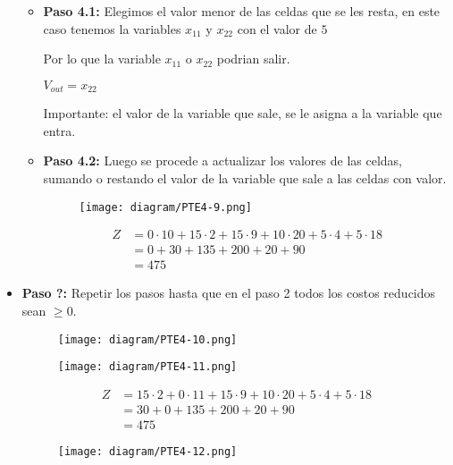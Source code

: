 \documentclass{templateNote}
\begin{document}
\begin{itemize}
    \begin{itemize}
        \item \textbf{Paso 4.1:} Elegimos el valor menor de las celdas que se les resta, en este caso tenemos la variables $x_{11}$ y $x_{22}$ con el valor de $5$
        
        Por lo que la variable $x_{11}$ o $x_{22}$ podrian salir.
        \begin{center}
            $V_{out} = x_{22}$
        \end{center}

        Importante: el valor de la variable que sale, se le asigna a la variable que entra.

        \item \textbf{Paso 4.2:} Luego se procede a actualizar los valores de las celdas, sumando o restando el valor de la variable que sale a las celdas con valor.
        \begin{figure}[H]
            \centering
            \texttt{[image: diagram/PTE4-9.png]}
        \end{figure}
        \begin{align*}
            Z &= 0 \cdot 10 + 15 \cdot 2 + 15 \cdot 9 + 10 \cdot 20 + 5 \cdot 4 + 5 \cdot 18\\
            &= 0 + 30 + 135 + 200 + 20 + 90 \\
            &= 475
        \end{align*}
    \end{itemize}
    \item \textbf{Paso ?:} Repetir los pasos hasta que en el paso 2 todos los costos reducidos sean $\geq 0$.
    \begin{figure}[H]
        \centering
        \texttt{[image: diagram/PTE4-10.png]}
    \end{figure}

    \begin{figure}[H]
        \centering
        \texttt{[image: diagram/PTE4-11.png]}
    \end{figure}
    \begin{align*}
        Z &= 15 \cdot 2 + 0 \cdot 11 + 15 \cdot 9 + 10 \cdot 20 + 5 \cdot 4 + 5 \cdot 18\\
        &= 30 + 0 + 135 + 200 + 20 + 90 \\
        &= 475
    \end{align*}

    \begin{figure}[H]
        \centering
        \texttt{[image: diagram/PTE4-12.png]}
    \end{figure}


\end{itemize}
\end{document}
